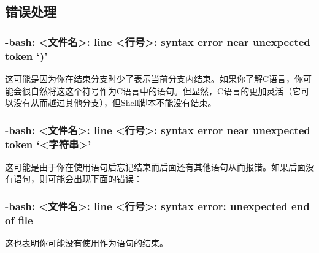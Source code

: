 \subsection{错误处理}\label{subsec:分支语句-错误处理}

\subsubsection{-bash: <文件名>: line <行号>: syntax error near unexpected token `)'}

这可能是因为你在结束分支时少了\code{;;}表示当前分支内结束。如果你了解C语言，你可能会很自然将这这个符号作为C语言中的语句。但显然，C语言的更加灵活（它可以没有从而越过其他分支），但Shell脚本不能没有\code{;;}结束。

\subsubsection{-bash: <文件名>: line <行号>: syntax error near unexpected token `<字符串>'}

这可能是由于你在使用语句后忘记结束而后面还有其他语句从而报错。如果后面没有语句，则可能会出现下面的错误：

\subsubsection{-bash: <文件名>: line <行号>: syntax error: unexpected end of file}

这也表明你可能没有使用作为语句的结束。